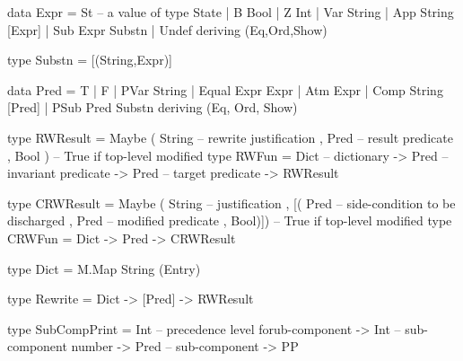 \label{ha:calc-types-txt}



\begin{code}
data Expr
 = St  -- a value of type State
 | B Bool
 | Z Int
 | Var String
 | App String [Expr]
 | Sub Expr Substn
 | Undef
 deriving (Eq,Ord,Show)

type Substn = [(String,Expr)]
\end{code}

\begin{code}
data Pred
 = T
 | F
 | PVar String
 | Equal Expr Expr
 | Atm Expr
 | Comp String [Pred]
 | PSub Pred Substn
 deriving (Eq, Ord, Show)
\end{code}
\begin{code}
type RWResult
 = Maybe ( String  -- rewrite justification
         , Pred  -- result predicate
         , Bool )  -- True if top-level modified
type RWFun = Dict     -- dictionary
            -> Pred     -- invariant predicate
            -> Pred     -- target predicate
            -> RWResult
\end{code}

\begin{code}
type CRWResult
 = Maybe ( String      -- justification
         , [( Pred   -- side-condition to be discharged
            , Pred   -- modified predicate
            , Bool)])  -- True if top-level modified
type CRWFun = Dict -> Pred -> CRWResult
\end{code}

\newpage
\begin{code}
type Dict = M.Map String (Entry)
\end{code}

\begin{code}
type Rewrite = Dict -> [Pred] -> RWResult
\end{code}

\begin{code}
type SubCompPrint
 = Int       -- precedence level forub-component
   -> Int    -- sub-component number
   -> Pred -- sub-component
   -> PP
\end{code}


